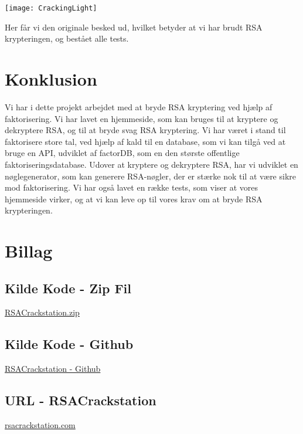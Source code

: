 \documentclass[a4paper,12pt]{extarticle}
\begin{document}
    \begin{center}
        \texttt{[image: CrackingLight]}\label{img:cracking}  %
    \end{center}

    Her får vi den originale besked ud, hvilket betyder at vi har brudt RSA krypteringen, og bestået alle tests.

    
    \section{Konklusion}\label{sec:konklusion}
    Vi har i dette projekt arbejdet med at bryde RSA kryptering ved hjælp af faktorisering.
    Vi har lavet en hjemmeside, som kan bruges til at kryptere og dekryptere RSA, og til at bryde svag RSA kryptering.
    Vi har været i stand til faktorisere store tal, ved hjælp af kald til en database, 
    som vi kan tilgå ved at bruge en API, udviklet af factorDB, som en den største offentlige faktoriseringsdatabase.
    Udover at kryptere og dekryptere RSA, har vi udviklet en nøglegenerator, som kan generere RSA-nøgler, 
    der er stærke nok til at være sikre mod faktorisering.
    Vi har også lavet en række tests, som viser at vores hjemmeside virker,
    og at vi kan leve op til vores krav om at bryde RSA krypteringen.
    
    \section{Billag}\label{sec:billag}
    \subsection{Kilde Kode - Zip Fil}\label{subsec:billag-source-code}
    \href{https://github.com/Zymat-dk/RSACrackstation/archive/refs/heads/main.zip}{RSACrackstation.zip}
    \subsection{Kilde Kode - Github}\label{subsec:billag-github}
    \href{https://github.com/Zymat-dk/RSACrackstation}{RSACrackstation - Github}
    \subsection{URL - RSACrackstation}\label{subsec:billag-url}
    \href{https://rsacrackstation.com}{rsacrackstation.com}
    
\end{document}
